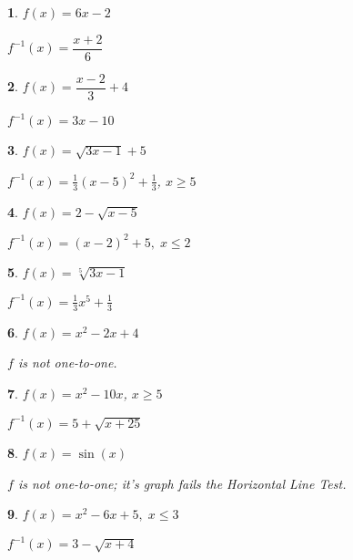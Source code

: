 \documentclass{amsbook}
\newtheorem{exc}{}
\newenvironment{ex}{\begin{exc}\normalfont}{\end{exc}}
\numberwithin{section}{chapter}
\numberwithin{equation}{chapter}
\begin{document}
\begin{multicols}{2}
\begin{ex}
	$f(x) = 6x - 2$
	\begin{sol}
		$f^{-1}(x) = \dfrac{x + 2}{6}$
	\end{sol}
\end{ex}

\begin{ex}
	$f(x) = \dfrac{x-2}{3} + 4$
	\begin{sol}
		$f^{-1}(x) = 3x-10$
	\end{sol}
\end{ex}

\begin{ex}
	$f(x) = \sqrt{3x-1}+5$
	\begin{sol}
		$f^{-1}(x) = \frac{1}{3}(x-5)^2+\frac{1}{3}$, $x \geq 5$
	\end{sol}
\end{ex}

\begin{ex}
	$f(x) = 2-\sqrt{x - 5}$
	\begin{sol}
		$f^{-1}(x) = (x - 2)^{2} + 5, \; x \leq 2$
	\end{sol}
\end{ex}

\begin{ex}
	$f(x) = \sqrt[5]{3x-1}$
	\begin{sol}
	$f^{-1}(x) = \frac{1}{3} x^{5} + \frac{1}{3}$	
	\end{sol}
\end{ex}


\begin{ex}
	$f(x) = x^2-2x+4$
	\begin{sol}
		$f$ is not one-to-one.
	\end{sol}
\end{ex}

\begin{ex}
	$f(x) = x^2 - 10x$, $x \geq 5$
	\begin{sol}
		$f^{-1}(x) = 5 + \sqrt{x+25}$
	\end{sol}
\end{ex}


\begin{ex}
	$f(x) = \sin(x)$
	\begin{sol}
		$f$ is not one-to-one; it's graph fails the Horizontal Line Test.
	\end{sol}
\end{ex}

\begin{ex}
	$f(x) = x^2-6x+5, \; x \leq 3$
	\begin{sol}
		$f^{-1}(x) = 3 - \sqrt{x+4}$
	\end{sol}
\end{ex}


\end{multicols}
\end{document}
